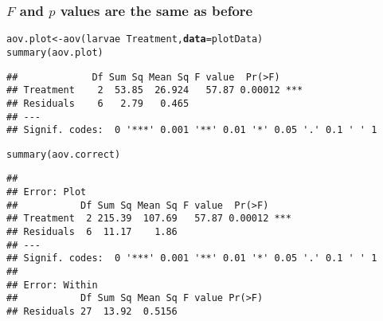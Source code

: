 \documentclass[color=usenames,dvipsnames]{beamer}\usepackage[]{graphicx}\usepackage[]{color}
\makeatletter
\newcommand{\hlopt}[1]{\textcolor[rgb]{0,0,0}{#1}}%
\newcommand{\hlstd}[1]{\textcolor[rgb]{0,0,0}{#1}}%
\newcommand{\hlkwb}[1]{\textcolor[rgb]{0,0.341,0.682}{#1}}%
\newcommand{\hlkwc}[1]{\textcolor[rgb]{0,0,0}{\textbf{#1}}}%
\newcommand{\hlkwd}[1]{\textcolor[rgb]{0.004,0.004,0.506}{#1}}%
\newenvironment{kframe}{%
 \def\at@end@of@kframe{}%
 \ifinner\ifhmode%
  \def\at@end@of@kframe{\end{minipage}}%
  \begin{minipage}{\columnwidth}%
 \fi\fi%
 \def\FrameCommand##1{\hskip\@totalleftmargin \hskip-\fboxsep
 \colorbox{shadecolor}{##1}\hskip-\fboxsep
     \hskip-\linewidth \hskip-\@totalleftmargin \hskip\columnwidth}%
 \MakeFramed {\advance\hsize-\width
   \@totalleftmargin\z@ \linewidth\hsize
   \@setminipage}}%
 {\par\unskip\endMakeFramed%
 \at@end@of@kframe}
\newenvironment{knitrout}{}{} %
\makeatother
\begin{document}
\begin{frame}[fragile]
  \frametitle{$F$ and $p$ values are the same as before}
\begin{knitrout}\scriptsize
{}\color{fgcolor}\begin{kframe}
\begin{alltt}
\hlstd{aov.plot} \hlkwb{<-} \hlkwd{aov}\hlstd{(larvae} \hlopt{~} \hlstd{Treatment,} \hlkwc{data}\hlstd{=plotData)}
\hlkwd{summary}\hlstd{(aov.plot)}
\end{alltt}
\begin{verbatim}
##             Df Sum Sq Mean Sq F value  Pr(>F)    
## Treatment    2  53.85  26.924   57.87 0.00012 ***
## Residuals    6   2.79   0.465                    
## ---
## Signif. codes:  0 '***' 0.001 '**' 0.01 '*' 0.05 '.' 0.1 ' ' 1
\end{verbatim}
\end{kframe}
\end{knitrout}
\pause
\begin{knitrout}\scriptsize
{}\color{fgcolor}\begin{kframe}
\begin{alltt}
\hlkwd{summary}\hlstd{(aov.correct)}
\end{alltt}
\begin{verbatim}
## 
## Error: Plot
##           Df Sum Sq Mean Sq F value  Pr(>F)    
## Treatment  2 215.39  107.69   57.87 0.00012 ***
## Residuals  6  11.17    1.86                    
## ---
## Signif. codes:  0 '***' 0.001 '**' 0.01 '*' 0.05 '.' 0.1 ' ' 1
## 
## Error: Within
##           Df Sum Sq Mean Sq F value Pr(>F)
## Residuals 27  13.92  0.5156
\end{verbatim}
\end{kframe}
\end{knitrout}
\end{frame}
\end{document}
